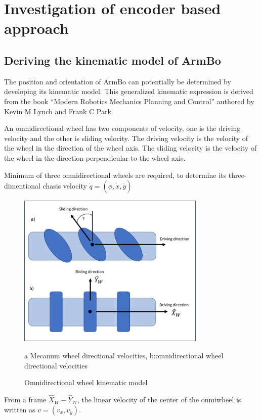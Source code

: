 \documentclass[12pt, twoside]{report}
\begin{document}
\newpage
\section{Investigation of encoder based approach}
\subsection{Deriving the kinematic model of ArmBo}

The position and orientation of ArmBo can potentially be determined by
developing its kinematic model. This generalized kinematic expression
is derived from the book “Modern Robotics Mechanics Planning and Control”
authored by Kevin M Lynch and Frank C Park.

An omnidirectional wheel has two components of velocity, one is the driving velocity
and the other is sliding velocity. The driving velocity is the velocity of the wheel
in the direction of the wheel axis. The sliding velocity is the velocity of the wheel
in the direction perpendicular to the wheel axis.

Minimum of three omnidirectional wheels are required, to determine its three-dimentional
chasis velocity $\dot{q} = (\dot{\phi}, \dot{x}, \dot{y}) $

\begin{figure}[h!]
    \centering
    \includegraphics[width=0.8\textwidth]{m_wheel_kinematic.png}
    \caption{Omnidirectional wheel kinematic model}
    {a Mecanum wheel directional velocities, b:omnidirectional wheel directional velocities}
    \label{fig:wheel_kinematic}
\end{figure}


From a frame $\hat{X}_W - \hat{Y}_W$, the linear velocity of the center of the onmiwheel is
written as $v = (v_x, v_y)$.
\end{document}
